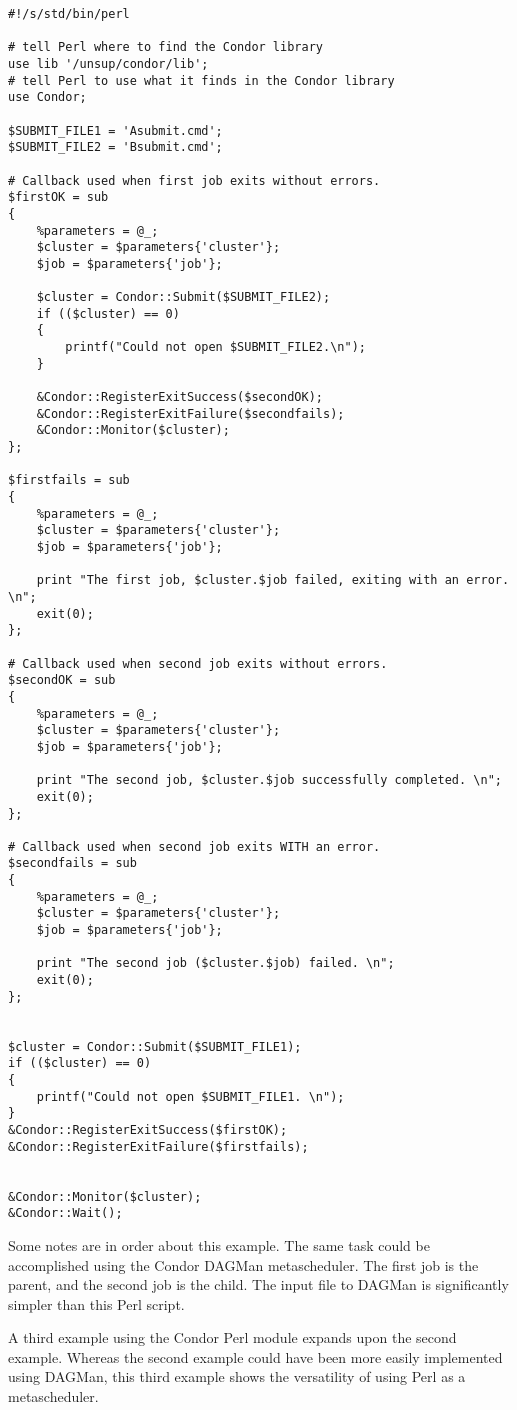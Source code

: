\footnotesize
\begin{verbatim}
#!/s/std/bin/perl

# tell Perl where to find the Condor library
use lib '/unsup/condor/lib';
# tell Perl to use what it finds in the Condor library
use Condor;

$SUBMIT_FILE1 = 'Asubmit.cmd';
$SUBMIT_FILE2 = 'Bsubmit.cmd';

# Callback used when first job exits without errors.
$firstOK = sub
{
    %parameters = @_;
    $cluster = $parameters{'cluster'};
    $job = $parameters{'job'};

    $cluster = Condor::Submit($SUBMIT_FILE2);
    if (($cluster) == 0)
    {
        printf("Could not open $SUBMIT_FILE2.\n");
    }

    &Condor::RegisterExitSuccess($secondOK);
    &Condor::RegisterExitFailure($secondfails);
    &Condor::Monitor($cluster);
};	

$firstfails = sub
{
    %parameters = @_;
    $cluster = $parameters{'cluster'};
    $job = $parameters{'job'};

    print "The first job, $cluster.$job failed, exiting with an error. \n";
    exit(0);
};	

# Callback used when second job exits without errors.
$secondOK = sub
{
    %parameters = @_;
    $cluster = $parameters{'cluster'};
    $job = $parameters{'job'};

    print "The second job, $cluster.$job successfully completed. \n";
    exit(0);
};	

# Callback used when second job exits WITH an error.
$secondfails = sub
{
    %parameters = @_;
    $cluster = $parameters{'cluster'};
    $job = $parameters{'job'};

    print "The second job ($cluster.$job) failed. \n";
    exit(0);
};	


$cluster = Condor::Submit($SUBMIT_FILE1);
if (($cluster) == 0)
{
    printf("Could not open $SUBMIT_FILE1. \n");
}
&Condor::RegisterExitSuccess($firstOK);
&Condor::RegisterExitFailure($firstfails);


&Condor::Monitor($cluster);
&Condor::Wait();
\end{verbatim}
\normalsize

Some notes are in order about this example.
The same task could be accomplished using the Condor DAGMan
metascheduler.
The first job is the parent, and the second job is the child.
The input file to DAGMan is significantly simpler than this
Perl script.

A third example using the Condor Perl module
expands upon the second example.
Whereas the second example could have been more easily
implemented using DAGMan, this third example shows
the versatility of using Perl as a metascheduler.

